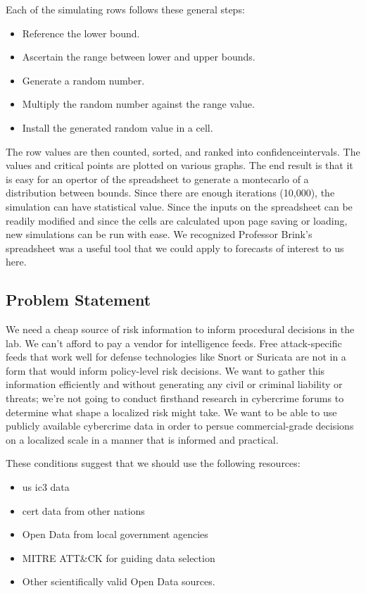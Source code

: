 Each of the simulating rows follows these general steps:
\begin{itemize}
\item{Reference the lower bound.}
\item{Ascertain the range between lower and upper bounds.}
\item{Generate a random number.}
\item{Multiply the random number against the range value.}
\item{Install the generated random value in a cell.}
\end{itemize}
The row values are then counted, sorted, and ranked into \gls{confidenceinterval}s.  The values and critical points are plotted on various graphs.  The end result is that it is easy for an opertor of the spreadsheet to generate a \gls{montecarlo} of a \gls{distribution} between bounds.  Since there are enough iterations (10,000), the simulation can have statistical value.  Since the inputs on the spreadsheet can be readily modified and since the cells are calculated upon page saving or loading, new simulations can be run with ease.  We recognized Professor Brink's spreadsheet was a useful tool that we could apply to forecasts of interest to us here.
\subsection{Problem Statement}
We need a cheap source of risk information to inform procedural decisions in the lab.  We can't afford to pay a vendor for intelligence feeds.  Free \gls{attack}-specific feeds that work well for defense technologies like Snort or Suricata are not in a form that would inform policy-level risk decisions.  We want to gather this information efficiently and without generating any civil or criminal liability or threats; we're not going to conduct firsthand research in  \gls{cybercrime} forums to determine what shape a localized risk might take.  We want to be able to  use publicly available  \gls{cybercrime} data in order to persue commercial-grade decisions on a localized scale in a manner that is informed and practical.

These conditions suggest that we should use the following resources:
\begin{itemize}
  \item \gls{us} \gls{ic3} data
  \item \gls{cert} data from other nations
  \item{} Open Data from local government agencies
  \item MITRE ATT\&CK for guiding data selection
  \item Other scientifically valid Open Data sources.
\end{itemize}


